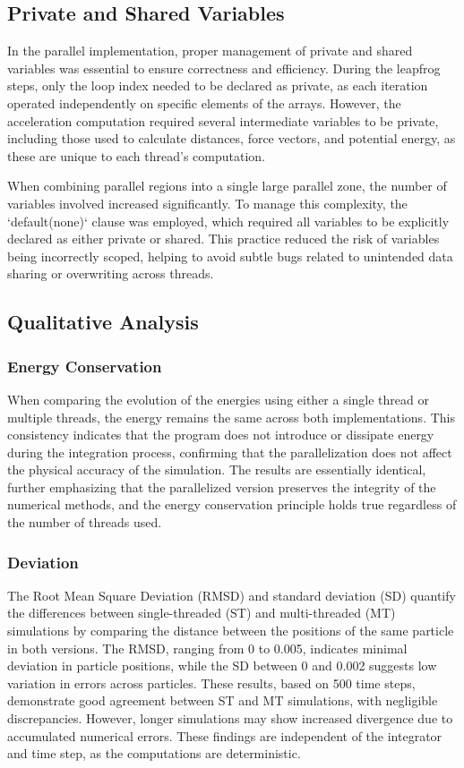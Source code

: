 \documentclass[english,11pt]{article}
\begin{document}
\subsection{Private and Shared Variables}
In the parallel implementation, proper management of private and shared variables was essential to ensure correctness and efficiency. During the leapfrog steps, only the loop index needed to be declared as private, as each iteration operated independently on specific elements of the arrays. However, the acceleration computation required several intermediate variables to be private, including those used to calculate distances, force vectors, and potential energy, as these are unique to each thread's computation.

When combining parallel regions into a single large parallel zone, the number of variables involved increased significantly. To manage this complexity, the `default(none)` clause was employed, which required all variables to be explicitly declared as either private or shared. This practice reduced the risk of variables being incorrectly scoped, helping to avoid subtle bugs related to unintended data sharing or overwriting across threads.


\subsection{Qualitative Analysis}
\subsubsection{Energy Conservation}
When comparing the evolution of the energies using either a single thread or multiple threads, the energy remains the same across both implementations. This consistency indicates that the program does not introduce or dissipate energy during the integration process, confirming that the parallelization does not affect the physical accuracy of the simulation. The results are essentially identical, further emphasizing that the parallelized version preserves the integrity of the numerical methods, and the energy conservation principle holds true regardless of the number of threads used.


\subsubsection{Deviation}

The Root Mean Square Deviation (RMSD) and standard deviation (SD) quantify the differences between single-threaded (ST) and multi-threaded (MT) simulations by comparing the distance between the positions of the same particle in both versions. The RMSD, ranging from 0 to 0.005, indicates minimal deviation in particle positions, while the SD between 0 and 0.002 suggests low variation in errors across particles. These results, based on 500 time steps, demonstrate good agreement between ST and MT simulations, with negligible discrepancies. However, longer simulations may show increased divergence due to accumulated numerical errors. These findings are independent of the integrator and time step, as the computations are deterministic.
\end{document}
